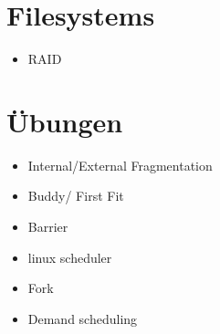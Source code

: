 \documentclass[10pt,a4paper]{article}
\begin{document}
	\section{Filesystems}
		\begin{itemize}
			\item RAID
		\end{itemize}
	\section{Übungen}
		\begin{itemize}
			\item Internal/External Fragmentation
			\item Buddy/ First Fit
			\item Barrier
			\item linux scheduler
			\item Fork
			\item Demand scheduling
		\end{itemize}
\end{document}
